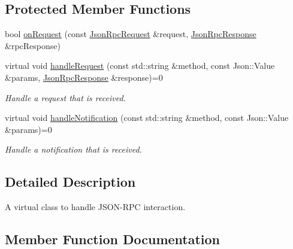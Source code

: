 \subsection*{Protected Member Functions}
\begin{DoxyCompactItemize}
\item 
bool \hyperlink{classdg_1_1deepcore_1_1network_1_1_json_rpc_server_ae4f695ab15a787b286e30e9597273cd4}{on\+Request} (const \hyperlink{classdg_1_1deepcore_1_1network_1_1_json_rpc_request}{Json\+Rpc\+Request} \&request, \hyperlink{classdg_1_1deepcore_1_1network_1_1_json_rpc_response}{Json\+Rpc\+Response} \&rpc\+Response)
\item 
virtual void \hyperlink{classdg_1_1deepcore_1_1network_1_1_json_rpc_server_adc423962543d5b9c49124415bbeef6e1}{handle\+Request} (const std\+::string \&method, const Json\+::\+Value \&params, \hyperlink{classdg_1_1deepcore_1_1network_1_1_json_rpc_response}{Json\+Rpc\+Response} \&response)=0
\begin{DoxyCompactList}\small\item\em Handle a request that is received. \end{DoxyCompactList}\item 
virtual void \hyperlink{classdg_1_1deepcore_1_1network_1_1_json_rpc_server_ae5d3b1476f87a044ee883420ae6d2c2d}{handle\+Notification} (const std\+::string \&method, const Json\+::\+Value \&params)=0
\begin{DoxyCompactList}\small\item\em Handle a notification that is received. \end{DoxyCompactList}\end{DoxyCompactItemize}


\subsection{Detailed Description}
A virtual class to handle J\+S\+O\+N-\/\+R\+PC interaction. 

\subsection{Member Function Documentation}
